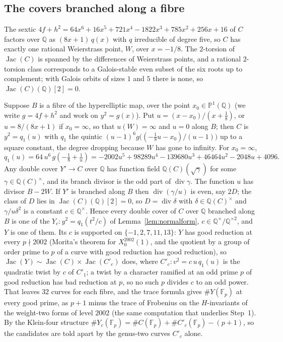 \documentclass[11pt,reqno]{amsart}
\theoremstyle{plain}
\theoremstyle{definition}
\DeclareMathOperator{\Jac}{Jac}
\newcommand{\Q}{\mathbb{Q}}
\newcommand{\F}{\mathbb{F}}
\begin{document}
\subsection*{The covers branched along a fibre}
The sextic $4f+h^2=64x^6+16x^5+721x^4-1822x^3+785x^2+256x+16$ of $C$ factors over $\Q$ as
$(8x+1)\,q(x)$ with $q$ irreducible of degree five, so $C$ has exactly one rational Weierstrass
point, $W$, over $x=-1/8$. The $2$-torsion of $\Jac(C)$ is spanned by the differences of
Weierstrass points, and a rational $2$-torsion class corresponds to a Galois-stable even subset of
the six roots up to complement; with Galois orbits of sizes $1$ and $5$ there is none, so
$\Jac(C)(\Q)[2]=0$.

Suppose $B$ is a fibre of the hyperelliptic map, over the point $x_0\in\mathbb P^1(\Q)$ (we
write $g=4f+h^2$ and work on $y^2=g(x)$). Put $u=(x-x_0)/(x+\tfrac18)$, or $u=8/(8x+1)$ if
$x_0=\infty$, so that $u(W)=\infty$ and $u=0$ along $B$; then $C$ is $y^2=q_1(u)$ with $q_1$ the
quintic $(u-1)^6g\bigl((-\tfrac18u-x_0)/(u-1)\bigr)$ up to a square constant, the degree dropping
because $W$ has gone to infinity. For $x_0=\infty$,
\[
  q_1(u)=64\,u^6\,g(-\tfrac18+\tfrac1u)=-2002u^5+98289u^4-139680u^3+46464u^2-2048u+4096 .
\]
Any double cover $Y'\to C$ over $\Q$ has function field $\Q(C)(\sqrt{\gamma})$ for some
$\gamma\in\Q(C)^\times$, and its branch divisor is the odd part of $\operatorname{div}\gamma$. The
function $u$ has divisor $B-2W$. If $Y'$ is branched along $B$ then $\operatorname{div}(\gamma/u)$ is
even, say $2D$; the class of $D$ lies in $\Jac(C)(\Q)[2]=0$, so $D=\operatorname{div}\delta$ with
$\delta\in\Q(C)^\times$ and $\gamma/u\delta^2$ is a constant $c\in\Q^\times$. Hence every double
cover of $C$ over $\Q$ branched along $B$ is one of the $Y_c\colon y^2=q_1(t^2/c)$ of
Lemma~\ref{lem:normalform}, $c\in\Q^\times/\Q^{\times2}$, and $Y$ is one of them. Its $c$ is
supported on $\{-1,2,7,11,13\}$: $Y$ has good reduction at every $p\nmid2002$ (Morita's theorem for
$X_0^{2002}(1)$, and the quotient by a group of order prime to $p$ of a curve with good reduction has
good reduction), so $\Jac(Y)\sim\Jac(C)\times\Jac(C'_c)$ does, where $C'_c\colon v^2=c\,u\,q_1(u)$
is the quadratic twist by $c$ of $C'_1$; a twist by a character ramified at an odd prime $p$ of good
reduction has bad reduction at $p$, so no such $p$ divides $c$ to an odd power. That leaves $32$
curves for each fibre, and the trace formula gives $\#Y(\F_p)$ at every good prime, as $p+1$ minus
the trace of Frobenius on the $H$-invariants of the weight-two forms of level $2002$ (the same
computation that underlies Step~1). By the Klein-four structure $\#Y_c(\F_p)=\#C(\F_p)+\#C'_c(\F_p)
-(p+1)$, so the candidates are told apart by the genus-two curves $C'_c$ alone.
\end{document}
